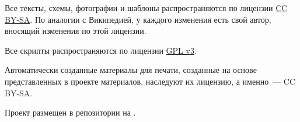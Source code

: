 \documentclass[11pt,fleqn]{report} %
\begin{document}
Все тексты, схемы, фотографии и шаблоны распространяются по лицензии \href{https://creativecommons.org/licenses/by-sa/4.0/legalcode.ru}{CC
  BY-SA}. По аналогии с Википедией, у каждого изменения есть свой автор, вносящий изменения по этой лицензии.

Все скрипты распространяются по лицензии \href{https://www.gnu.org/licenses/quick-guide-gplv3.ru.html}{GPL v3}.

Автоматически созданные материалы для печати, созданные на основе представленных в проекте материалов, наследуют их лицензию, а именно~---
CC BY-SA.

Проект размещен в репозитории на \gitRepo.

\clearpage

\printglossary[title={Термины}]
\end{document}
